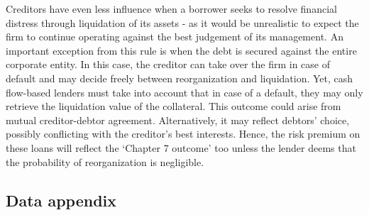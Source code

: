 \documentclass[12pt]{article}
\begin{document}
Creditors have even less influence when a borrower seeks to resolve financial distress through liquidation of its assets - as it would be unrealistic to expect the firm to continue operating against the best judgement of its management. An important exception from this rule is when the debt is secured against the entire corporate entity. In this case, the creditor can take over the firm in case of default and may decide freely between reorganization and liquidation. Yet, cash flow-based lenders must take into account that in case of a default, they may only retrieve the liquidation value of the collateral.  This outcome could arise from mutual creditor-debtor agreement. Alternatively, it may reflect debtors' choice, possibly conflicting with the creditor's best interests. Hence, the risk premium on these loans will reflect the `Chapter 7 outcome’ too unless the lender deems that the probability of reorganization is negligible. 

\subsection{Data appendix \label{sec:A3}}
\end{document}
